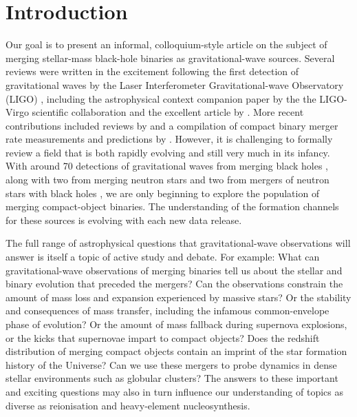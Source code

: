 \documentclass[review]{elsarticle}
\begin{document}
\section{Introduction}

Our goal is to present an informal, colloquium-style article on the subject of merging stellar-mass black-hole binaries as gravitational-wave sources. Several reviews were written in the excitement following the first detection \citep{GW150914} of gravitational waves by the Laser Interferometer Gravitational-wave Observatory (LIGO) \citep{GW150914:detectors}, including the astrophysical context companion paper by the the LIGO-Virgo scientific collaboration \citep{GW150914:astro} and the excellent article by \citet{Miller:2016}.  More recent contributions included reviews by \citet{Mapelli:2018,Mapelli:2021} and a compilation of compact binary merger rate measurements and predictions by \citet{MandelBroekgaarden:2021}. However, it is challenging to formally review a field that is both rapidly evolving and still very much in its infancy.  With around 70 detections of gravitational waves from merging black holes \citep{BBH:O1,BBH:O2,Venumadhav:2020,GWTC2,Abbott:2021-GWTC-2-1,GWTC3,Nitz:2021-4OGC,Olsen:2022}, along with two from merging neutron stars \citep{GW170817, GW190425} and two from mergers of neutron stars with black holes \citep{GW200105}, we are only beginning to explore the population of merging compact-object binaries.  The understanding of the formation channels for these sources is evolving with each new data release.

The full range of astrophysical questions that gravitational-wave observations will answer is itself a topic of active study and debate. For example: What can gravitational-wave observations of merging binaries tell us about the stellar and binary evolution that preceded the mergers?  Can the observations constrain the amount of mass loss and expansion experienced by massive stars? Or the stability and consequences of mass transfer, including the infamous common-envelope phase of evolution? Or the amount of mass fallback during supernova explosions, or the kicks that supernovae impart to compact objects? Does the redshift distribution of merging compact objects contain an imprint of the star formation history of the Universe?  Can we use these mergers to probe dynamics in dense stellar environments such as globular clusters? The answers to these important and exciting questions may also in turn influence our understanding of topics as diverse as reionisation and heavy-element nucleosynthesis.
\end{document}
